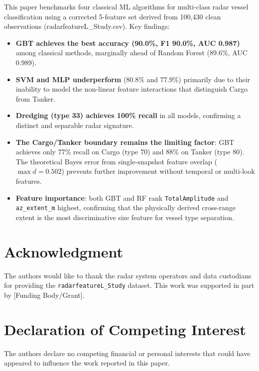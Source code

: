 \documentclass[journal]{IEEEtran}
\begin{document}
This paper benchmarks four classical ML algorithms for multi-class radar vessel
classification using a corrected 5-feature set derived from 100,430 clean
observations (radarfeatureL\_Study.csv).
Key findings:
\begin{itemize}
  \item \textbf{GBT achieves the best accuracy (90.0\%, F1 90.0\%, AUC 0.987)}
        among classical methods, marginally ahead of Random Forest
        (89.6\%, AUC 0.989).
  \item \textbf{SVM and MLP underperform} (80.8\% and 77.9\%) primarily due to
        their inability to model the non-linear feature interactions that
        distinguish Cargo from Tanker.
  \item \textbf{Dredging (type 33) achieves 100\% recall} in all models,
        confirming a distinct and separable radar signature.
  \item \textbf{The Cargo/Tanker boundary remains the limiting factor}: GBT
        achieves only 77\% recall on Cargo (type 70) and 88\% on Tanker (type 80).
        The theoretical Bayes error from single-snapshot feature overlap
        ($\max d = 0.502$) prevents further improvement without temporal
        or multi-look features.
  \item \textbf{Feature importance}: both GBT and RF rank
        \texttt{TotalAmplitude} and \texttt{az\_extent\_m} highest,
        confirming that the physically derived cross-range extent is the most
        discriminative size feature for vessel type separation.
\end{itemize}

\section*{Acknowledgment}
The authors would like to thank the radar system operators and data custodians for providing the \texttt{radarfeatureL\_Study} dataset. This work was supported in part by [Funding Body/Grant].

\section*{Declaration of Competing Interest}
The authors declare no competing financial or personal interests that could have appeared to influence the work reported in this paper.
\end{document}
